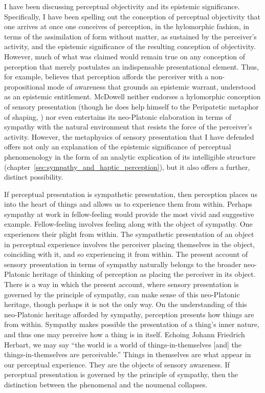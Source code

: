I have been discussing perceptual objectivity and its epistemic significance. Specifically, I have been spelling out the conception of perceptual objectivity that one arrives at once one conceives of perception, in the hylomorphic fashion, in terms of the assimilation of form without matter, as sustained by the perceiver's activity, and the epistemic significance of the resulting conception of objectivity. However, much of what was claimed would remain true on any conception of perception that merely postulates an indispensable presentational element. Thus, for example, \citet{McDowell:2008fk} believes that perception affords the perceiver with a non-propositional mode of awareness that grounds an epistemic warrant, understood as an epistemic entitlement. McDowell neither endorses a hylomorphic conception of sensory presentation (though he does help himself to the Peripatetic metaphor of shaping, \citealt{McDowell:1998vn}) nor even entertains its neo-Platonic elaboration in terms of sympathy with the natural environment that resists the force of the perceiver's activity. However, the metaphysics of sensory presentation that I have defended offers not only an explanation of the epistemic significance of perceptual phenomenology in the form of an analytic explication of its intelligible structure (chapter~\ref{sec:sympathy_and_haptic_perception}), but it also offers a further, distinct possibility.

If perceptual presentation is sympathetic presentation, then perception places us into the heart of things and allows us to experience them from within.  Perhaps sympathy at work in fellow-feeling would provide the most vivid and suggestive example. Fellow-feeling involves feeling along with the object of sympathy. One experiences their plight from within. The sympathetic presentation of an object in perceptual experience involves the perceiver placing themselves in the object, coinciding with it, and so experiencing it from within. The present account of sensory presentation in terms of sympathy naturally belongs to the broader neo-Platonic heritage of thinking of perception as placing the perceiver in its object. There is a way in which the present account, where sensory presentation is governed by the principle of sympathy, can make sense of this neo-Platonic heritage, though perhaps it is not the only way. On the understanding of this neo-Platonic heritage afforded by sympathy, perception presents how things are from within. Sympathy makes possible the presentation of a thing's inner nature, and thus one may perceive how a thing is in itself. Echoing Johann Friedrich Herbart, we may say ``the world is a world of things-in-themselves [and] the things-in-themselves are perceivable.'' Things in themselves are what appear in our perceptual experience. They are the objects of sensory awareness. If perceptual presentation is governed by the principle of sympathy, then the distinction between the phenomenal and the noumenal collapses.

